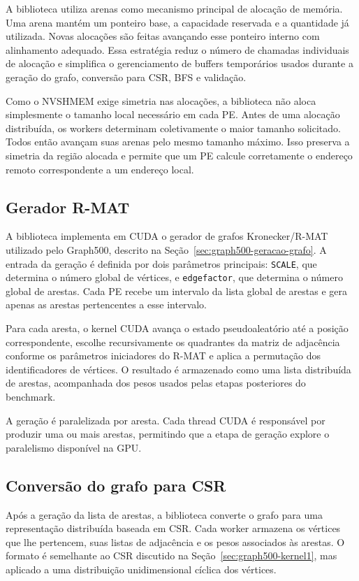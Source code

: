 A biblioteca utiliza arenas como mecanismo principal de alocação de memória. Uma
arena mantém um ponteiro base, a capacidade reservada e a quantidade já utilizada.
Novas alocações são feitas avançando esse ponteiro interno com alinhamento
adequado. Essa estratégia reduz o número de chamadas individuais de alocação e
simplifica o gerenciamento de buffers temporários usados durante a geração do
grafo, conversão para CSR, BFS e validação.

Como o NVSHMEM exige simetria nas alocações, a biblioteca não aloca simplesmente
o tamanho local necessário em cada PE. Antes de uma alocação distribuída, os
workers determinam coletivamente o maior tamanho solicitado. Todos então avançam
suas arenas pelo mesmo tamanho máximo. Isso preserva a simetria da região alocada
e permite que um PE calcule corretamente o endereço remoto correspondente a um
endereço local.

\subsection{Gerador R-MAT}
\label{sec:bib-gerador}

A biblioteca implementa em CUDA o gerador de grafos Kronecker/R-MAT utilizado
pelo Graph500, descrito na Seção~\ref{sec:graph500-geracao-grafo}. A entrada da
geração é definida por dois parâmetros principais: \texttt{SCALE}, que determina
o número global de vértices, e \texttt{edgefactor}, que determina o número global
de arestas. Cada PE recebe um intervalo da lista global de arestas e gera apenas
as arestas pertencentes a esse intervalo.

Para cada aresta, o kernel CUDA avança o estado pseudoaleatório até a
posição correspondente, escolhe recursivamente os quadrantes da matriz de
adjacência conforme os parâmetros iniciadores do R-MAT e aplica a permutação dos
identificadores de vértices. O resultado é armazenado como uma lista distribuída
de arestas, acompanhada dos pesos usados pelas etapas posteriores do benchmark.

A geração é paralelizada por aresta. Cada thread CUDA é responsável por produzir
uma ou mais arestas, permitindo que a etapa de geração explore o paralelismo
disponível na GPU. 

\subsection{Conversão do grafo para CSR}
\label{sec:bib-csr}

Após a geração da lista de arestas, a biblioteca converte o grafo para uma
representação distribuída baseada em CSR. Cada worker armazena os vértices que
lhe pertencem, suas listas de adjacência e os pesos associados às arestas. O
formato é semelhante ao CSR discutido na Seção~\ref{sec:graph500-kernel1}, mas
aplicado a uma distribuição unidimensional cíclica dos vértices.


